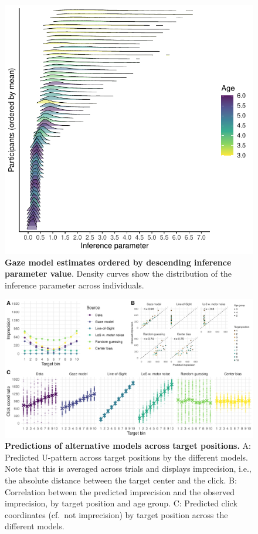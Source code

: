 \documentclass[
  man,floatsintext]{apa7}
\begin{document}
\newpage



\begin{figure}[H]
\includegraphics[width=1\linewidth]{../figures/supplements_gazemodel_indinference} \caption{\textbf{Gaze model estimates ordered by descending inference parameter value}. Density curves show the distribution of the inference parameter across individuals.}\label{fig:S4}
\end{figure}

\newpage



\begin{figure}[H]
\includegraphics[width=1\linewidth]{../figures/gazemodel_simulated_u} \caption{\textbf{Predictions of alternative models across target positions.} A: Predicted U-pattern across target positions by the different models. Note that this is averaged across trials and displays imprecision, i.e., the absolute distance between the target center and the click. B: Correlation between the predicted imprecision and the observed imprecision, by target position and age group. C: Predicted click coordinates (cf.~not imprecision) by target position across the different models.}\label{fig:S5}
\end{figure}


\clearpage
\renewcommand{\listfigurename}{Figure captions}

\clearpage
\renewcommand{\listtablename}{Table captions}
\end{document}
